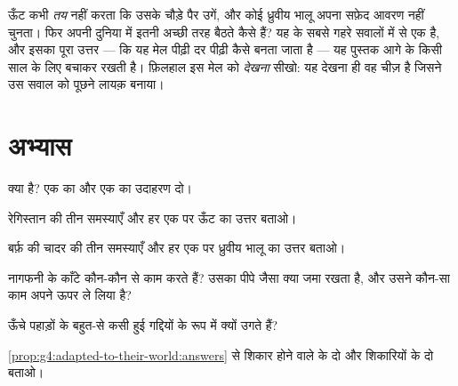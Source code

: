 \begin{remark}[यह मेल बनता कैसे है?]\label{rem:g4:adapted-to-their-world:how}
ऊँट कभी \emph{तय} नहीं करता कि उसके चौड़े पैर उगें, और कोई ध्रुवीय
भालू अपना सफ़ेद आवरण नहीं चुनता। फिर  अपनी दुनिया में इतनी अच्छी
तरह बैठते कैसे हैं? यह  के सबसे गहरे सवालों में से एक है, और
इसका पूरा उत्तर --- कि यह मेल पीढ़ी दर पीढ़ी कैसे बनता जाता है --- यह
पुस्तक आगे के किसी साल के लिए बचाकर रखती है। फ़िलहाल इस मेल को
\emph{देखना} सीखो: यह देखना ही वह चीज़ है जिसने उस सवाल को पूछने लायक़
बनाया।
\end{remark}

\section{अभ्यास}

\begin{exercise}[$\star$]\label{exo:g4:adapted-to-their-world:1}
 क्या है? एक  का और एक  का उदाहरण दो।
\end{exercise}

\begin{exercise}[$\star$]\label{exo:g4:adapted-to-their-world:2}
रेगिस्तान की तीन समस्याएँ और हर एक पर ऊँट का उत्तर बताओ।
\end{exercise}

\begin{exercise}[$\star$]\label{exo:g4:adapted-to-their-world:3}
बर्फ़ की चादर की तीन समस्याएँ और हर एक पर ध्रुवीय भालू का उत्तर बताओ।
\end{exercise}

\begin{exercise}[$\star$]\label{exo:g4:adapted-to-their-world:4}
नागफनी के काँटे कौन-कौन से काम करते हैं? उसका पीपे जैसा  क्या जमा
रखता है, और उसने कौन-सा काम अपने ऊपर ले लिया है?
\end{exercise}

\begin{exercise}[$\star$]\label{exo:g4:adapted-to-their-world:5}
ऊँचे पहाड़ों के बहुत-से  कसी हुई गद्दियों के रूप में क्यों उगते हैं?
\end{exercise}

\begin{exercise}[$\star$]\label{exo:g4:adapted-to-their-world:6}
\cref{prop:g4:adapted-to-their-world:answers} से शिकार होने वाले
 के दो और शिकारियों के दो  बताओ।
\end{exercise}

